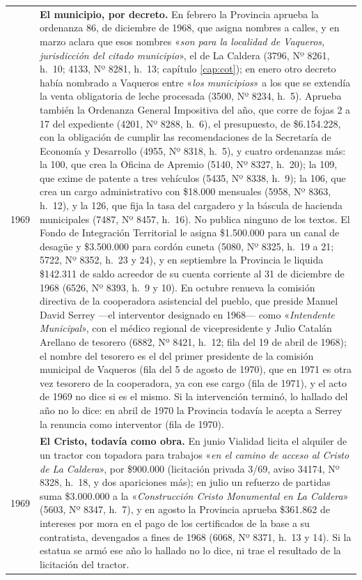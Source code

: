 \begin{longtable}{@{}p{2.7cm}p{10.3cm}@{}}
1969 & \textbf{El municipio, por decreto.} En febrero la Provincia aprueba la ordenanza 86, de diciembre de 1968, que asigna nombres a calles, y en marzo aclara que esos nombres «\textit{son para la localidad de Vaqueros, jurisdicción del citado municipio}», el de La Caldera (3796, Nº 8261, h.\ 10; 4133, Nº 8281, h.\ 13; capítulo \ref{cap:cot}); en enero otro decreto había nombrado a Vaqueros entre «\textit{los municipios}» a los que se extendía la venta obligatoria de leche procesada (3500, Nº 8234, h.\ 5). Aprueba también la Ordenanza General Impositiva del año, que corre de fojas 2 a 17 del expediente (4201, Nº 8288, h.\ 6), el presupuesto, de \$6.154.228, con la obligación de cumplir las recomendaciones de la Secretaría de Economía y Desarrollo (4955, Nº 8318, h.\ 5), y cuatro ordenanzas más: la 100, que crea la Oficina de Apremio (5140, Nº 8327, h.\ 20); la 109, que exime de patente a tres vehículos (5435, Nº 8338, h.\ 9); la 106, que crea un cargo administrativo con \$18.000 mensuales (5958, Nº 8363, h.\ 12), y la 126, que fija la tasa del cargadero y la báscula de hacienda municipales (7487, Nº 8457, h.\ 16). No publica ninguno de los textos. El Fondo de Integración Territorial le asigna \$1.500.000 para un canal de desagüe y \$3.500.000 para cordón cuneta (5080, Nº 8325, h.\ 19 a 21; 5722, Nº 8352, h.\ 23 y 24), y en septiembre la Provincia le liquida \$142.311 de saldo acreedor de su cuenta corriente al 31 de diciembre de 1968 (6526, Nº 8393, h.\ 9 y 10). En octubre renueva la comisión directiva de la cooperadora asistencial del pueblo, que preside Manuel David Serrey ---el interventor designado en 1968--- como «\textit{Intendente Municipal}», con el médico regional de vicepresidente y Julio Catalán Arellano de tesorero (6882, Nº 8421, h.\ 12; fila del 19 de abril de 1968); el nombre del tesorero es el del primer presidente de la comisión municipal de Vaqueros (fila del 5 de agosto de 1970), que en 1971 es otra vez tesorero de la cooperadora, ya con ese cargo (fila de 1971), y el acto de 1969 no dice si es el mismo. Si la intervención terminó, lo hallado del año no lo dice: en abril de 1970 la Provincia todavía le acepta a Serrey la renuncia como interventor (fila de 1970). \\
1969 & \textbf{El Cristo, todavía como obra.} En junio Vialidad licita el alquiler de un tractor con topadora para trabajos «\textit{en el camino de acceso al Cristo de La Caldera}», por \$900.000 (licitación privada 3/69, aviso 34174, Nº 8328, h.\ 18, y dos apariciones más); en julio un refuerzo de partidas suma \$3.000.000 a la «\textit{Construcción Cristo Monumental en La Caldera}» (5603, Nº 8347, h.\ 7), y en agosto la Provincia aprueba \$361.862 de intereses por mora en el pago de los certificados de la base a su contratista, devengados a fines de 1968 (6068, Nº 8371, h.\ 13 y 14). Si la estatua se armó ese año lo hallado no lo dice, ni trae el resultado de la licitación del tractor. \\

\end{longtable}
